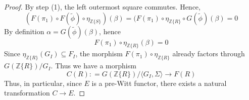 \documentclass[10pt,a4paper]{amsart}
\newcommand{\Z}{{\mathbb Z}}
\renewcommand{\tilde}{\widetilde}
\begin{document}
\begin{proof}
\noindent By step (1), the left outermost square commutes. Hence,
$$(F(\pi_1) \circ F(\tilde{\phi}) \circ \eta_{\Z\{S\}})(\beta) = (F(\pi_1) \circ \eta_{\Z\{R\}} \circ G(\tilde{\phi})(\beta) = 0 $$
By definition $\alpha = G(\tilde{\phi})(\beta)$, hence 
$$F(\pi_1) \circ \eta_{\Z\{R\}}(\beta) = 0 $$
Since $\eta_{\Z\{R\}}(G_I) \subseteq F_I$, the morphism $F(\pi_1) \circ \eta_{\Z\{R\}}$ already factors through $G(\Z\{R\})/G_I$. Thus we have a morphism 
$$C(R) : = G(\Z\{R\})/\langle G_I, \Sigma\rangle \to F(R)$$
Thus, in particular, since $E$ is a pre-Witt functor, there exists a natural transformation $C \to E$. 
\end{proof}
\end{document}
